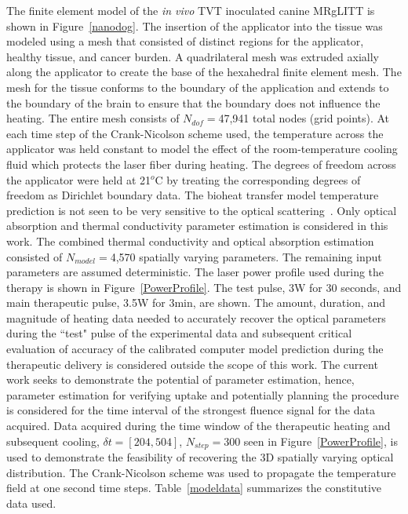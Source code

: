 \documentclass{article}
\begin{document}
The finite element model of the \textit{in vivo} TVT inoculated canine
MRgLITT is shown in Figure~\ref{nanodog}. The insertion of the
applicator into the tissue was modeled using a mesh that consisted of
distinct regions for the applicator, healthy tissue, and cancer burden.
A quadrilateral mesh was extruded axially along the applicator to create
the base of the hexahedral finite element mesh. The mesh for the tissue
conforms to the boundary of the application and extends to the boundary
of the brain to ensure that the boundary does not influence the heating.
The entire mesh consists of $N_{dof}=$47,941 total nodes (grid points).
At each time step of the Crank-Nicolson scheme used, the temperature
across the applicator was held constant to model the effect of the
room-temperature cooling fluid which protects the laser fiber during
heating. The degrees of freedom across the applicator were held at
21$^o$C by treating the corresponding degrees of freedom as Dirichlet
boundary data. The bioheat transfer model temperature prediction is not
seen to be very sensitive to the optical scattering~\cite{Fengetal07}. 
Only optical absorption and thermal conductivity
parameter estimation is considered in this work.
The combined thermal conductivity and optical
absorption estimation consisted of $N_{model}=$4,570
spatially varying parameters. 
The remaining input parameters are assumed deterministic.
 The laser power profile used
during the therapy is shown in Figure~\ref{PowerProfile}. The test
pulse, 3W for 30 seconds, and main therapeutic pulse, 3.5W for 3min, are
shown. 
The amount, duration, and magnitude of heating data needed to accurately
recover the optical parameters during the ``test" pulse of the
experimental data and subsequent critical evaluation of accuracy of the
calibrated computer model prediction during the therapeutic delivery is
considered outside the scope of this work. The current work seeks to
demonstrate the potential of parameter estimation, hence, parameter
estimation for verifying uptake and potentially planning the procedure
is considered for the time interval of the strongest fluence signal for
the data acquired. Data acquired during the time window of the
therapeutic heating and subsequent cooling, $\delta t = [204,504]$,
$N_{step} = 300$ seen
in Figure~\ref{PowerProfile}, is used to demonstrate the feasibility of
recovering the 3D spatially varying optical distribution.  The
Crank-Nicolson scheme was used to propagate the temperature field at one
second time steps.  Table~\ref{modeldata} summarizes the constitutive
data used.
\end{document}

